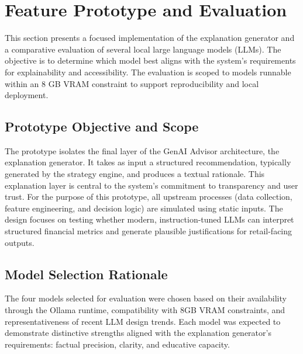 \section{Feature Prototype and Evaluation}

This section presents a focused implementation of the explanation generator and a comparative evaluation of several local large language models (LLMs). The objective is to determine which model best aligns with the system’s requirements for explainability and accessibility. The evaluation is scoped to models runnable within an 8 GB VRAM constraint to support reproducibility and local deployment.

\subsection{Prototype Objective and Scope}

The prototype isolates the final layer of the GenAI Advisor architecture, the explanation generator. It takes as input a structured recommendation, typically generated by the strategy engine, and produces a textual rationale. This explanation layer is central to the system's commitment to transparency and user trust. For the purpose of this prototype, all upstream processes (data collection, feature engineering, and decision logic) are simulated using static inputs. The design focuses on testing whether modern, instruction-tuned LLMs can interpret structured financial metrics and generate plausible justifications for retail-facing outputs.

\subsection{Model Selection Rationale}

The four models selected for evaluation were chosen based on their availability through the Ollama runtime, compatibility with 8GB VRAM constraints, and representativeness of recent LLM design trends. Each model was expected to demonstrate distinctive strengths aligned with the explanation generator’s requirements: factual precision, clarity, and educative capacity.

